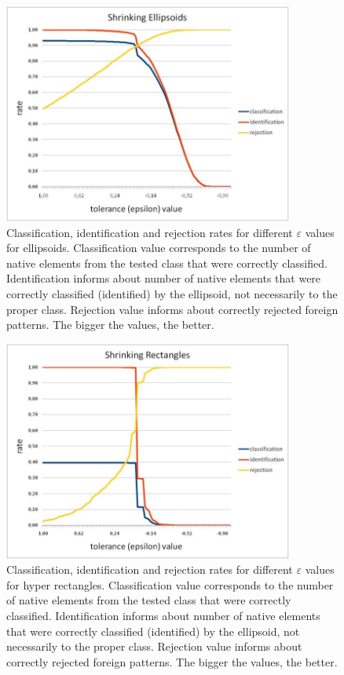 \begin{figure}[htp]
	\centering
	\includegraphics[width=0.85\textwidth]{Figures/shrinking_ellipsoids_tolerance_manipulation.jpg}
	\caption{ Classification, identification and rejection rates for different $\varepsilon$ values for ellipsoids. Classification value corresponds to the number of native elements from the tested class that were correctly classified. Identification informs about number of native elements that were correctly classified (identified) by the ellipsoid, not necessarily to the proper class. Rejection value informs about correctly rejected foreign patterns. The bigger the values, the better. }
	\label{fig:shrinking_ellipsoids_tolerance_manipulation}\vspace{-3pt}
\end{figure}

\begin{figure}[htp]
\centering
\includegraphics[width=0.85\textwidth]{Figures/shrinking_rectangles_tolerance_manipulation.jpg}
\caption{ Classification, identification and rejection rates for different $\varepsilon$ values for hyper rectangles. Classification value corresponds to the number of native elements from the tested class that were correctly classified. Identification informs about number of native elements that were correctly classified (identified) by the ellipsoid, not necessarily to the proper class. Rejection value informs about correctly rejected foreign patterns. The bigger the values, the better. }
\label{fig:shrinking_rectangles_tolerance_manipulation}\vspace{-3pt}
\end{figure}

